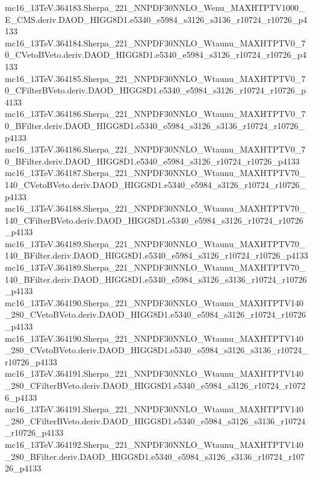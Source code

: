 \begin{footnotesize}
mc16\_13TeV.364183.Sherpa\_221\_NNPDF30NNLO\_Wenu\_MAXHTPTV1000\_E\_CMS.deriv.DAOD\_HIGG8D1.e5340\_e5984\_s3126\_s3136\_r10724\_r10726\_p4133 \\
mc16\_13TeV.364184.Sherpa\_221\_NNPDF30NNLO\_Wtaunu\_MAXHTPTV0\_70\_CVetoBVeto.deriv.DAOD\_HIGG8D1.e5340\_e5984\_s3126\_r10724\_r10726\_p4133 \\
mc16\_13TeV.364185.Sherpa\_221\_NNPDF30NNLO\_Wtaunu\_MAXHTPTV0\_70\_CFilterBVeto.deriv.DAOD\_HIGG8D1.e5340\_e5984\_s3126\_r10724\_r10726\_p4133 \\
mc16\_13TeV.364186.Sherpa\_221\_NNPDF30NNLO\_Wtaunu\_MAXHTPTV0\_70\_BFilter.deriv.DAOD\_HIGG8D1.e5340\_e5984\_s3126\_s3136\_r10724\_r10726\_p4133 \\
mc16\_13TeV.364186.Sherpa\_221\_NNPDF30NNLO\_Wtaunu\_MAXHTPTV0\_70\_BFilter.deriv.DAOD\_HIGG8D1.e5340\_e5984\_s3126\_r10724\_r10726\_p4133 \\
mc16\_13TeV.364187.Sherpa\_221\_NNPDF30NNLO\_Wtaunu\_MAXHTPTV70\_140\_CVetoBVeto.deriv.DAOD\_HIGG8D1.e5340\_e5984\_s3126\_r10724\_r10726\_p4133 \\
mc16\_13TeV.364188.Sherpa\_221\_NNPDF30NNLO\_Wtaunu\_MAXHTPTV70\_140\_CFilterBVeto.deriv.DAOD\_HIGG8D1.e5340\_e5984\_s3126\_r10724\_r10726\_p4133 \\
mc16\_13TeV.364189.Sherpa\_221\_NNPDF30NNLO\_Wtaunu\_MAXHTPTV70\_140\_BFilter.deriv.DAOD\_HIGG8D1.e5340\_e5984\_s3126\_r10724\_r10726\_p4133 \\
mc16\_13TeV.364189.Sherpa\_221\_NNPDF30NNLO\_Wtaunu\_MAXHTPTV70\_140\_BFilter.deriv.DAOD\_HIGG8D1.e5340\_e5984\_s3126\_s3136\_r10724\_r10726\_p4133 \\
mc16\_13TeV.364190.Sherpa\_221\_NNPDF30NNLO\_Wtaunu\_MAXHTPTV140\_280\_CVetoBVeto.deriv.DAOD\_HIGG8D1.e5340\_e5984\_s3126\_r10724\_r10726\_p4133 \\
mc16\_13TeV.364190.Sherpa\_221\_NNPDF30NNLO\_Wtaunu\_MAXHTPTV140\_280\_CVetoBVeto.deriv.DAOD\_HIGG8D1.e5340\_e5984\_s3126\_s3136\_r10724\_r10726\_p4133 \\
mc16\_13TeV.364191.Sherpa\_221\_NNPDF30NNLO\_Wtaunu\_MAXHTPTV140\_280\_CFilterBVeto.deriv.DAOD\_HIGG8D1.e5340\_e5984\_s3126\_r10724\_r10726\_p4133 \\
mc16\_13TeV.364191.Sherpa\_221\_NNPDF30NNLO\_Wtaunu\_MAXHTPTV140\_280\_CFilterBVeto.deriv.DAOD\_HIGG8D1.e5340\_e5984\_s3126\_s3136\_r10724\_r10726\_p4133 \\
mc16\_13TeV.364192.Sherpa\_221\_NNPDF30NNLO\_Wtaunu\_MAXHTPTV140\_280\_BFilter.deriv.DAOD\_HIGG8D1.e5340\_e5984\_s3126\_s3136\_r10724\_r10726\_p4133 \\

\end{footnotesize}
